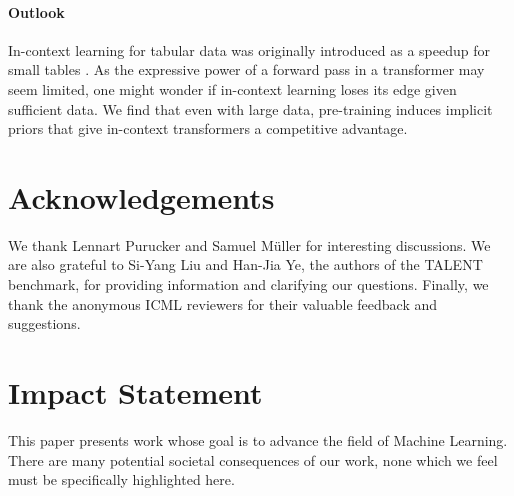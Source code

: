 \documentclass{article}
\makeatletter
\theoremstyle{plain}
\theoremstyle{definition}
\theoremstyle{remark}
\renewcommand{\appendixtocname}{Appendix Contents.}
\newcommand{\listofappendices}{%
  \begingroup
  \renewcommand{\contentsname}{\appendixtocname}
  \let\@oldstarttoc\@starttoc
  \def\@starttoc##1{\@oldstarttoc{app}}
  \tableofcontents%
  \endgroup
}
\makeatother
\begin{document}
\paragraph{Outlook} In-context learning for tabular data was originally introduced as a speedup for small tables \cite{hollmannTabpfnTransformerThat2022}. As the expressive power of a forward pass in a transformer may seem limited, one might wonder if in-context learning loses its edge given sufficient data. We find that even with large data, pre-training induces implicit priors that give in-context transformers a competitive advantage.

\newpage
\section*{Acknowledgements}
We thank Lennart Purucker and Samuel Müller for interesting discussions. We are also grateful to Si-Yang Liu and Han-Jia Ye, the authors of the TALENT benchmark, for providing information and clarifying our questions. Finally, we thank the anonymous ICML reviewers for their valuable feedback and suggestions.

\section*{Impact Statement}
This paper presents work whose goal is to advance the field of 
Machine Learning. There are many potential societal consequences 
of our work, none which we feel must be specifically highlighted here.






\newpage
\onecolumn
\appendix
%


\end{document}
